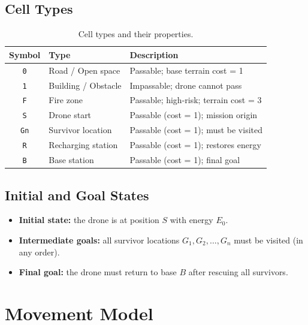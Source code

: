 \documentclass[12pt]{article}
\begin{document}
\subsection{Cell Types}

\begin{table}[H]
\centering
\begin{tabular}{@{} c l l @{}}
\toprule
\textbf{Symbol} & \textbf{Type} & \textbf{Description} \\
\midrule
\texttt{0}  & Road / Open space     & Passable; base terrain cost = 1 \\
\texttt{1}  & Building / Obstacle   & Impassable; drone cannot pass \\
\texttt{F}  & Fire zone             & Passable; high-risk; terrain cost = 3 \\
\texttt{S}  & Drone start           & Passable (cost = 1); mission origin \\
\texttt{Gn} & Survivor location     & Passable (cost = 1); must be visited \\
\texttt{R}  & Recharging station    & Passable (cost = 1); restores energy \\
\texttt{B}  & Base station          & Passable (cost = 1); final goal \\
\bottomrule
\end{tabular}
\caption{Cell types and their properties.}
\end{table}

\subsection{Initial and Goal States}

\begin{itemize}
    \item \textbf{Initial state:} the drone is at position $S$ with energy $E_0$.
    \item \textbf{Intermediate goals:} all survivor locations $G_1, G_2, \ldots, G_n$
          must be visited (in any order).
    \item \textbf{Final goal:} the drone must return to base $B$ after rescuing
          all survivors.
\end{itemize}

\section{Movement Model}
\end{document}

